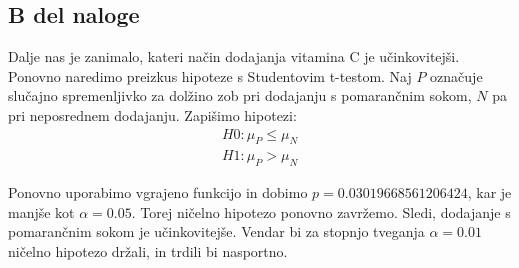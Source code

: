 \documentclass{article}
\begin{document}
\subsection{B del naloge}
Dalje nas je zanimalo, kateri način dodajanja vitamina C je učinkovitejši. Ponovno naredimo preizkus hipoteze s
Studentovim t-testom.
Naj $P$ označuje slučajno spremenljivko za dolžino zob pri dodajanju s pomarančnim sokom, $N$ pa pri neposrednem dodajanju.
Zapišimo hipotezi:
\begin{align}
    H0: \mu_P \le \mu_N \\
    H1: \mu_P > \mu_N
\end{align}

Ponovno uporabimo vgrajeno funkcijo in dobimo $p=0.03019668561206424$, kar je manjše kot $\alpha=0.05$.
Torej ničelno hipotezo ponovno zavržemo. Sledi, dodajanje s pomarančnim sokom je učinkovitejše.
Vendar bi za stopnjo tveganja $\alpha=0.01$ ničelno hipotezo držali, in trdili bi nasportno.
\end{document}
